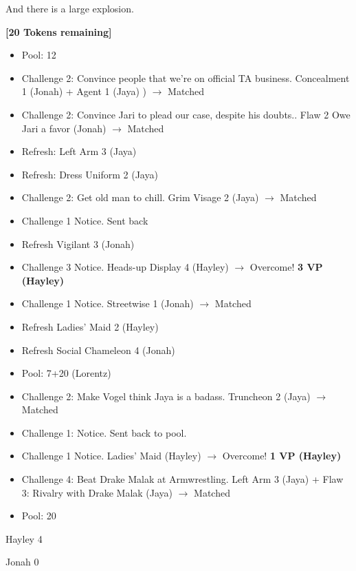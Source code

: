 And there is a large explosion.





\textbf{{[}20 Tokens remaining{]}}





\begin{itemize}
\item Pool: 12
\item Challenge 2: Convince people that we're on official TA business.  Concealment 1 (Jonah) + Agent 1 (Jaya) ) $\rightarrow$ Matched
\item Challenge 2: Convince Jari to plead our case, despite his doubts..  Flaw 2 Owe Jari a favor (Jonah) $\rightarrow$ Matched
\item Refresh: Left Arm 3 (Jaya)
\item Refresh: Dress Uniform 2 (Jaya)
\item Challenge 2: Get old man to chill.  Grim Visage 2 (Jaya) $\rightarrow$ Matched
\item Challenge 1 Notice. Sent back
\item Refresh Vigilant 3 (Jonah)
\item Challenge 3 Notice.  Heads-up Display 4 (Hayley) $\rightarrow$ Overcome! \textbf{3 VP (Hayley)}
\item Challenge 1 Notice.  Streetwise 1 (Jonah) $\rightarrow$ Matched
\item Refresh Ladies' Maid 2 (Hayley)
\item Refresh Social Chameleon 4 (Jonah)
\item Pool: 7+20 (Lorentz)
\item Challenge 2: Make Vogel think Jaya is a badass.  Truncheon 2 (Jaya) $\rightarrow$ Matched
\item Challenge 1: Notice.  Sent back to pool.
\item Challenge 1 Notice.  Ladies' Maid (Hayley) $\rightarrow$ Overcome! \textbf{1 VP (Hayley)}
\item Challenge 4: Beat Drake Malak at Armwrestling.  Left Arm 3 (Jaya) + Flaw 3: Rivalry with Drake Malak (Jaya) $\rightarrow$ Matched
\item Pool: 20
\end{itemize}





Hayley 4

Jonah 0

